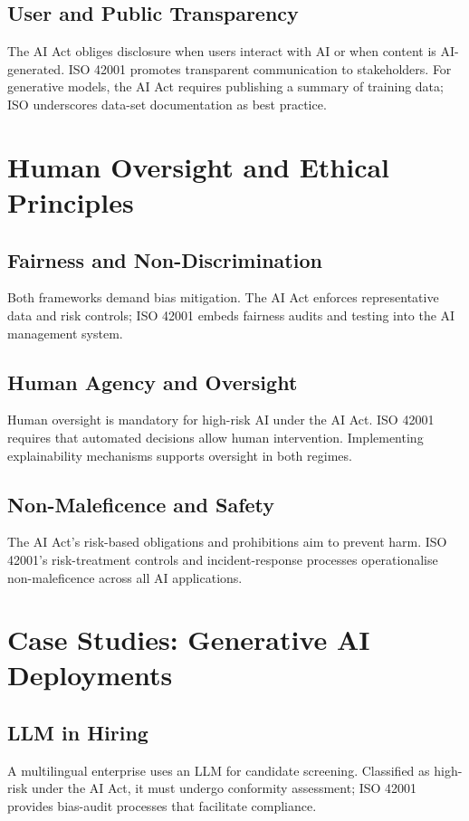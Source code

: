 \documentclass{article}
\begin{document}
\subsection{User and Public Transparency}
The AI Act obliges disclosure when users interact with AI or when content is AI-generated. ISO 42001 promotes transparent communication to stakeholders. For generative models, the AI Act requires publishing a summary of training data; ISO underscores data-set documentation as best practice.

\section{Human Oversight and Ethical Principles}
\subsection{Fairness and Non-Discrimination}
Both frameworks demand bias mitigation. The AI Act enforces representative data and risk controls; ISO 42001 embeds fairness audits and testing into the AI management system.

\subsection{Human Agency and Oversight}
Human oversight is mandatory for high-risk AI under the AI Act. ISO 42001 requires that automated decisions allow human intervention. Implementing explainability mechanisms supports oversight in both regimes.

\subsection{Non-Maleficence and Safety}
The AI Act’s risk-based obligations and prohibitions aim to prevent harm. ISO 42001’s risk-treatment controls and incident-response processes operationalise non-maleficence across all AI applications.

\section{Case Studies: Generative AI Deployments}
\subsection{LLM in Hiring}
A multilingual enterprise uses an LLM for candidate screening. Classified as high-risk under the AI Act, it must undergo conformity assessment; ISO 42001 provides bias-audit processes that facilitate compliance.
\end{document}
